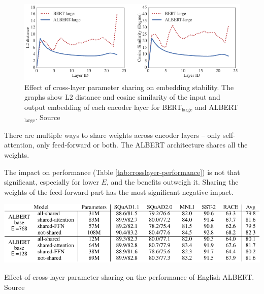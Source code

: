 \documentclass[
  printed, %
  color,   %
  table,   %
  oneside, %
  lof,     %
  lot,     %
]{fithesis3}
\begin{document}
\begin{figure}[h]
  \begin{center}
    \includegraphics{img/crosslayer-stability.pdf}
  \end{center}
  \vspace{-0.5cm}
  \caption[Effect of cross-layer parameter sharing on embedding stability]
    {Effect of cross-layer parameter sharing on embedding stability. The graphs show L2 distance and cosine similarity of the input and output embedding of each encoder layer for BERT$_\text{large}$ and ALBERT$_\text{large}$. Source \parencite[Figure 1]{albert}}
  \label{fig:crosslayer-stability}
\end{figure}

There are multiple ways to share weights across encoder layers -- only self-attention, only feed-forward or both. The ALBERT architecture shares all the weights.

The impact on performance (Table \ref{tab:crosslayer-performance}) is not that significant, especially for lower $E$, and the benefits outweigh it. Sharing the weights of the feed-forward part has the most significant negative impact.

\begin{table}[h]
  \begin{center}
    \includegraphics[width=\linewidth]{img/crosslayer-performance.pdf}
  \end{center}
  \vspace{-0.5cm}
  \caption[Effect of cross-layer parameter sharing on performance]{Effect of cross-layer parameter sharing on the performance of English ALBERT. Source \parencite[Table 4]{albert}}
  \label{tab:crosslayer-performance}
\end{table}
\end{document}
